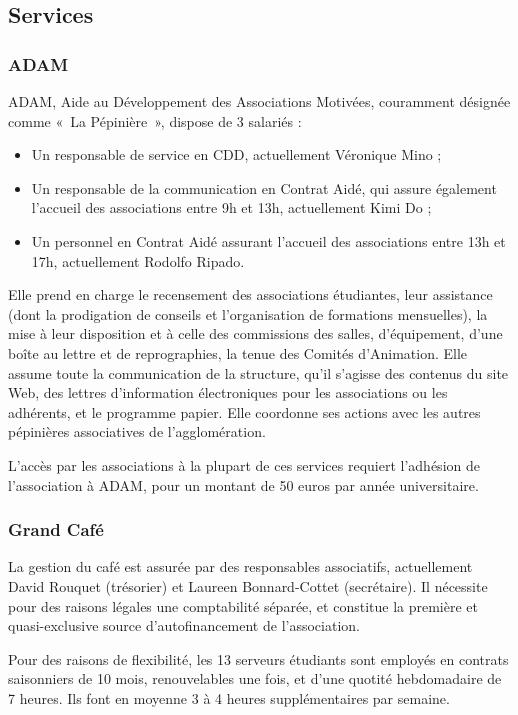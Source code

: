 \subsection{Services}

\subsubsection{ADAM}

ADAM, Aide au Développement des Associations Motivées, couramment désignée
comme «~La Pépinière~», dispose de 3 salariés :
\begin{itemize}
\item Un responsable de service en CDD, actuellement Véronique Mino ;
\item Un responsable de la communication en Contrat Aidé, qui assure également l'accueil
      des associations entre 9h et 13h, actuellement Kimi Do ;
\item Un personnel en Contrat Aidé assurant l'accueil des associations entre 13h et 17h,
      actuellement Rodolfo Ripado.
\end{itemize}

Elle prend en charge le recensement des associations étudiantes, leur assistance
(dont la prodigation de conseils et l'organisation de formations mensuelles),
la mise à leur disposition et à celle des commissions des salles, d'équipement,
d'une boîte au lettre et de reprographies, la tenue des Comités d'Animation.
Elle assume toute la communication de la structure, qu'il s'agisse des contenus
du site Web, des lettres d'information électroniques pour les associations ou
les adhérents, et le programme papier.
Elle coordonne ses actions avec les autres pépinières associatives de
l'agglomération.

L'accès par les associations à la plupart de ces services requiert l'adhésion
de l'association à ADAM, pour un montant de 50 euros par année universitaire.

\subsubsection{Grand Café}

La gestion du café est assurée par des responsables associatifs, actuellement
David Rouquet (trésorier) et Laureen Bonnard-Cottet (secrétaire).
Il nécessite pour des raisons légales une comptabilité séparée,
et constitue la première et quasi-exclusive source d'autofinancement de
l'association.

Pour des raisons de flexibilité, les 13 serveurs étudiants sont employés en
contrats saisonniers de 10 mois, renouvelables une fois, et d'une quotité
hebdomadaire de 7 heures. Ils font en moyenne 3 à 4 heures supplémentaires
par semaine.

